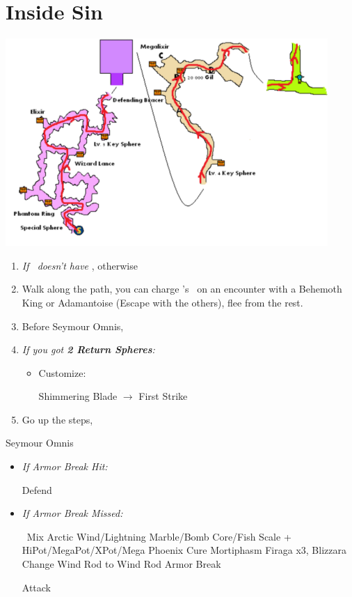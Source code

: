 \chapter{Inside Sin}
\includegraphics{graphics/sinpath}
\begin{enumerate}
	\item \textit{If \rikku\ doesn't have \od} \formation{\tidus}{\auron}{\rikku}, otherwise \formation{\tidus}{\auron}{\kimahri}
	\item Walk along the path, you can charge \rikku's \od\ on an encounter with a Behemoth King or Adamantoise (Escape with the others), flee from the rest.
	\item Before Seymour Omnis, \formation{\tidus}{\auron}{\yuna}
    \item \textit{If you got \textbf{2 Return Spheres}:}
        \begin{itemize}
            \item Customize:
                \begin{itemize}
                    \auronf Shimmering Blade $\rightarrow$ First Strike
                \end{itemize}
        \end{itemize}
	\item Go up the steps, \sd
\end{enumerate}
\bothvfill\winvfill\lossvfill
\begin{battle}[80000]{Seymour Omnis}
	\begin{itemize}
		\yunaf Defend
		\tidusf Armor Break
		\item \textit{If Armor Break Hit:}
			\begin{itemize}
				\auronf Defend
			\end{itemize}
		\item \textit{If Armor Break Missed:}
			\begin{itemize}
				\switch{\auron}{\rikku}
				\rikkuf \od\ Mix Arctic Wind/Lightning Marble/Bomb Core/Fish Scale + HiPot/MegaPot/XPot/Mega Phoenix
				\yunaf Cure Mortiphasm
				\enemyf Firaga x3, Blizzara
				\yunaf Change Wind Rod to Wind Rod
				\tidusf Armor Break
			\end{itemize}
		\summon{\bahamut}
		\bahamutf Attack
	\end{itemize}
\end{battle}
